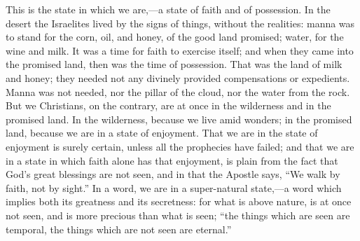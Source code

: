 This is the state in which we are,—a state of faith and of
possession. In the desert the Israelites lived by the signs of things,
without the realities: manna was to stand for the corn, oil, and
honey, of the good land promised; water, for the wine and milk. It was
a time for faith to exercise itself; and when they came into the
promised land, then was the time of possession. That was the land of
milk and honey; they needed not any divinely provided compensations or
expedients. Manna was not needed, nor the pillar of the cloud, nor the
water from the rock. But we Christians, on the contrary, are at once
in the wilderness and in the promised land. In the wilderness, because
we live amid wonders; in the promised land, because we are in a state
of enjoyment. That we are in the state of enjoyment is surely certain,
unless all the prophecies have failed; and that we are in a state in
which faith alone has that enjoyment, is plain from the fact that
God's great blessings are not seen, and in that the Apostle says,
``We walk by faith, not by sight.'' In a word, we are in a
super-natural state,—a word which implies both its greatness and its
secretness: for what is above nature, is at once not seen, and is more
precious than what is seen; ``the things which are seen are
temporal, the things which are not seen are eternal.''

